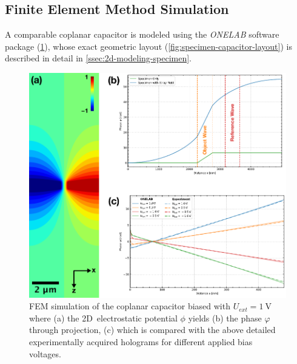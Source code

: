 \subsection{Finite Element Method Simulation} \label{ssec:experimental-results-capacitor-FEM-simulation}
A comparable coplanar capacitor is modeled using the \emph{ONELAB} software package (\cref{fig:capacitor-FEM-EH-linescan-comparison}), whose exact geometric layout (\cref{fig:specimen-capacitor-layout}) is described in detail in \cref{ssec:2d-modeling-specimen}.
\begin{figure}[H]
	\centering
	\includegraphics[width=\textwidth]{Figures/Results/Capacitor/Simulations/capacitor-FEM-EH-linescan-comparison.pdf}
	\caption{FEM simulation of the coplanar capacitor biased with $U_{\mathit{ext}} = \SI{1}{\volt}$ where (a) the 2D~electrostatic potential $\phi$ yields (b) the phase $\varphi$ through projection, (c) which is compared with the above detailed experimentally acquired holograms for different applied bias voltages.}
	\label{fig:capacitor-FEM-EH-linescan-comparison}
\end{figure}
